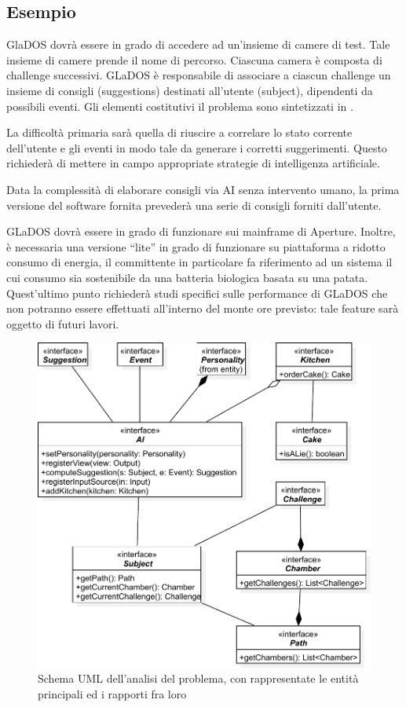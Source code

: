 \documentclass[a4paper,12pt]{report}
\begin{document}
\subsection*{Esempio}
GlaDOS dovrà essere in grado di accedere ad un'insieme di camere di test.
%
Tale insieme di camere prende il nome di percorso.
%
Ciascuna camera è composta di challenge successivi.
%
GLaDOS è responsabile di associare a ciascun challenge un insieme di consigli (suggestions) destinati all'utente (subject), dipendenti da possibili eventi.
%
Gli elementi costitutivi il problema sono sintetizzati in .

La difficoltà primaria sarà quella di riuscire a correlare lo stato corrente dell'utente e gli eventi in modo tale da generare i corretti suggerimenti.
%
Questo richiederà di mettere in campo appropriate strategie di intelligenza artificiale.

Data la complessità di elaborare consigli via AI senza intervento umano, la prima versione del software fornita prevederà una serie di consigli forniti dall'utente.

GLaDOS dovrà essere in grado di funzionare sui mainframe di Aperture.
%
Inoltre, è necessaria una versione ``lite'' in grado di funzionare su piattaforma a ridotto consumo di energia, il committente in particolare fa riferimento ad un sistema il cui consumo sia sostenibile da una batteria biologica basata su una patata.
%
Quest'ultimo punto richiederà studi specifici sulle performance di GLaDOS che non potranno essere effettuati all'interno del monte ore previsto: tale feature sarà oggetto di futuri lavori.

\begin{figure}
\centering{}
\includegraphics{img/analysis}
\caption{Schema UML dell'analisi del problema, con rappresentate le entità principali ed i rapporti fra loro}
\label{img:analysis}
\end{figure}
\end{document}

